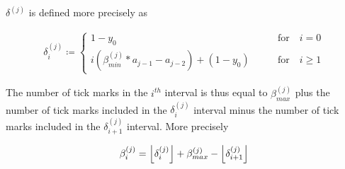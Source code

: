 \begin{definition}
  $\delta^{(j)}$ is defined more precisely as

  \begin{align}\label{delta_beta}
    \delta^{(j)}_i \coloneqq \begin{cases}
      1-y_0 \qquad &\text{for} \quad i = 0\\
      i (\beta^{(j)}_{min} * a_{j-1} - a_{j-2}) + (1-y_0) \qquad &\text{for} \quad i \ge 1
    \end{cases}
  \end{align}
\end{definition}

The number of tick marks in the $i^{th}$ interval is thus equal to $\beta^{(j)}_{max}$ plus the number of tick marks included in the $\delta^{(j)}_i$ interval minus the number of tick marks included in the $\delta^{(j)}_{i+1}$ interval. More precisely

\begin{align}\label{eq:beta_i}
  \beta^{(j)}_i = \floor{\delta^{(j)}_i} + \beta^{(j)}_{max} - \floor{\delta^{(j)}_{i+1}}
\end{align}
